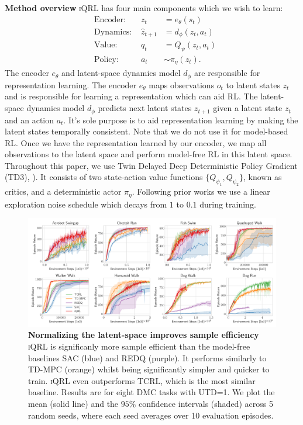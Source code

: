 \documentclass{article}
\theoremstyle{plain}
\theoremstyle{definition}
\theoremstyle{remark}
\newcommand{\our}{\textsc{iQRL}\xspace}
\begin{document}
\textbf{Method overview}
\our has four main components which we wish to learn:
\begin{align}
&\text{Encoder: } & z_{t} &= e_{\theta} (s_{t}) \label{eq:encoder} \\
&\text{Dynamics: } & \hat{z}_{t+1} &= d_{\phi} (z_{t}, a_{t}) \label{eq:transition} \\
&\text{Value: } & q_{t} &= Q_{\psi} (z_{t}, a_{t}) \label{eq:value} \\
&\text{Policy: } & a_{t} &\sim \pi_{\eta} (z_{t}) . \label{eq:policy}
\end{align}
The encoder $e_{\theta}$  and latent-space dynamics model $d_{\phi}$ are responsible for representation learning.
The encoder $e_{\theta}$ maps observations $o_{t}$ to latent states $z_{t}$ and is responsible for learning a representation
which can aid RL.
The latent-space dynamics model $d_{\phi}$ predicts next latent states $z_{t+1}$ given a latent state $z_{t}$ and an action $a_{t}$.
It's sole purpose is to aid representation learning by making the latent states temporally consistent.
Note that we do not use it for model-based RL.
Once we have the representation learned by our encoder, we map all observations to the latent space and perform model-free RL
in this latent space.
Throughout this paper, we use Twin Delayed Deep Deterministic Policy Gradient
(TD3), \citep{fujimotoAddressingFunctionApproximation2018}).
It consists of two state-action value functions $\{Q_{\psi_{1}},Q_{\psi_{2}} \}$, known as critics, and a deterministic
actor $\pi_{\eta}$.
Following prior works \citep{yaratsMasteringVisualContinuous2021} we use a linear exploration noise schedule
which decays from $1$ to $0.1$ during training.


\begin{figure}[ht]
\vskip 0.2in
\begin{center}
\centerline{\includegraphics[width=1.0\textwidth]{./figs/baselines_comparison.pdf}}
\caption{\textbf{Normalizing the latent-space improves sample efficiency} \our is significanly more sample efficient than the model-free baselines SAC (blue) and REDQ (purple). It performs similarly to TD-MPC (orange) whilst being significantly simpler and quicker to train. \our even outperforms TCRL, which is the most similar baseline. Results are for eight DMC tasks with UTD=1. We plot the mean (solid line) and the $95\%$ confidence intervals (shaded) across 5 random seeds, where each seed averages over 10 evaluation episodes.}
\label{fig:normalization_improves_sample_efficiency}
\end{center}
\vskip -0.2in
\end{figure}
\end{document}
